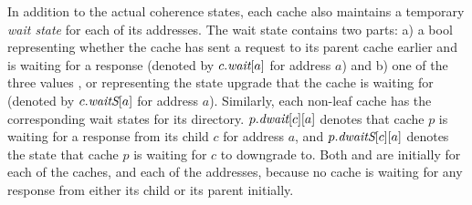 In addition to the actual coherence states, each cache also maintains a
temporary \emph{wait state} for each of its addresses. The wait state contains
two parts: a) a bool representing whether the cache has sent a request to its
parent cache earlier and is waiting for a response (denoted by $c.\textit{wait}[a]$ for
address $a$) and b) one of the three values \Mo, \Sh{} or \In representing the
state upgrade that the cache is waiting for (denoted by $c.\textit{waitS}[a]$ for
address $a$). Similarly, each non-leaf cache has the corresponding wait states
for its directory.  $p.\textit{dwait}[c][a]$ denotes that cache $p$ is waiting for a
response from its child $c$ for address $a$, and $p.\textit{dwaitS}[c][a]$ denotes the
state that cache $p$ is waiting for $c$ to downgrade to. Both \wait{} and
\dwait{} are \False{} initially for each of the caches, and each of the
addresses, because no cache is waiting for any response from either its child
or its parent initially.

